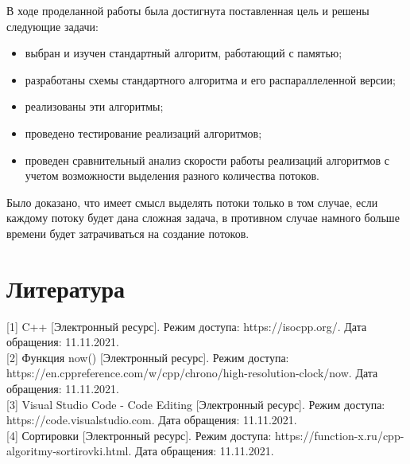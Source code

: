 \documentclass[12pt, a4paper]{report}
\begin{document}
В ходе проделанной работы была достигнута поставленная цель и решены следующие задачи:

\begin{itemize}
	\item выбран и изучен стандартный алгоритм, работающий с памятью;
	\item разработаны схемы стандартного алгоритма и его распараллеленной версии;
	\item реализованы эти алгоритмы;
	\item проведено тестирование реализаций алгоритмов;
	\item проведен сравнительный анализ скорости работы реализаций алгоритмов с учетом возможности выделения разного количества потоков.
\end{itemize}

Было доказано, что имеет смысл выделять потоки только в том случае, если каждому потоку будет дана сложная задача, в противном случае намного больше времени будет затрачиваться на создание потоков.

\chapter*{Литература}

[1] C++ [Электронный ресурс]. Режим доступа: https://isocpp.org/. Дата обращения: 11.11.2021.\\

[2] Функция now() [Электронный ресурс]. Режим доступа: \newline https://en.cppreference.com/w/cpp/chrono/high-resolution-clock/now. Дата обращения: 11.11.2021.\\

[3] Visual Studio Code - Code Editing [Электронный ресурс]. Режим доступа: https://code.visualstudio.com. Дата обращения: 11.11.2021.\\

[4] Сортировки [Электронный ресурс]. Режим доступа: \newline https://function-x.ru/cpp-algoritmy-sortirovki.html. Дата обращения: 11.11.2021.
\end{document}
